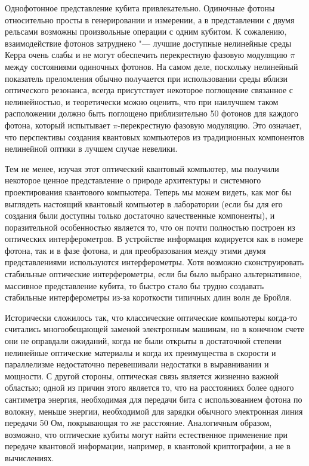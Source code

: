 \begin{multicols}{2}
{        Однофотонное представление кубита привлекательно. Одиночные фотоны относительно
        просты в генерировании и измерении, а в представлении с двумя рельсами возможны произвольные
        операции с одним кубитом. К сожалению, взаимодействие фотонов затруднено "--- лучшие доступные нелинейные среды Керра очень слабы и не могут обеспечить перекрестную фазовую модуляцию
        $\pi$ между состояниями одиночных фотонов. На самом деле, поскольку нелинейный показатель преломления обычно
        получается при использовании среды вблизи оптического резонанса, всегда присутствует некоторое поглощение
        связанное с нелинейностью, и теоретически можно оценить, что при наилучшем таком
        расположении должно быть поглощено приблизительно 50 фотонов для каждого фотона, который испытывает $\pi$-перекрестную фазовую модуляцию. Это означает, что перспективы создания квантовых
        компьютеров из традиционных компонентов нелинейной оптики в лучшем случае невелики.

        Тем не менее, изучая этот оптический квантовый компьютер, мы получили некоторое
        ценное представление о природе архитектуры и системного проектирования квантового
        компьютера. Теперь мы можем видеть, как мог бы выглядеть настоящий квантовый компьютер в
        лаборатории (если бы для его создания были доступны только достаточно качественные компоненты), и
        поразительной особенностью является то, что он почти полностью построен из оптических интерферометров.
        В устройстве информация кодируется как в номере фотона, так и в фазе
        фотона, и для преобразования между этими двумя представлениями используются интерферометры.
        Хотя возможно сконструировать стабильные оптические интерферометры, если бы было выбрано альтернативное, массивное
        представление кубита, то быстро стало бы трудно создавать
        стабильные интерферометры из-за короткости типичных длин волн де Бройля.

        Исторически сложилось так, что классические оптические компьютеры когда-то считались многообещающей заменой электронным машинам, но в конечном счете они не оправдали ожиданий, когда не были открыты в достаточной степени нелинейные оптические материалы и когда их преимущества в скорости и параллелизме недостаточно перевешивали недостатки в выравнивании и мощности. С другой стороны, оптическая связь является жизненно важной областью; одной из причин этого является то, что на расстояниях более одного сантиметра энергия, необходимая для передачи бита с использованием фотона по волокну, меньше энергии, необходимой для зарядки обычного
        электронная линия передачи 50 Ом, покрывающая то же расстояние. Аналогичным образом, возможно, что оптические кубиты могут найти естественное применение при передаче квантовой информации, например, в квантовой криптографии, а не в вычислениях.
    }\\

\end{multicols}
